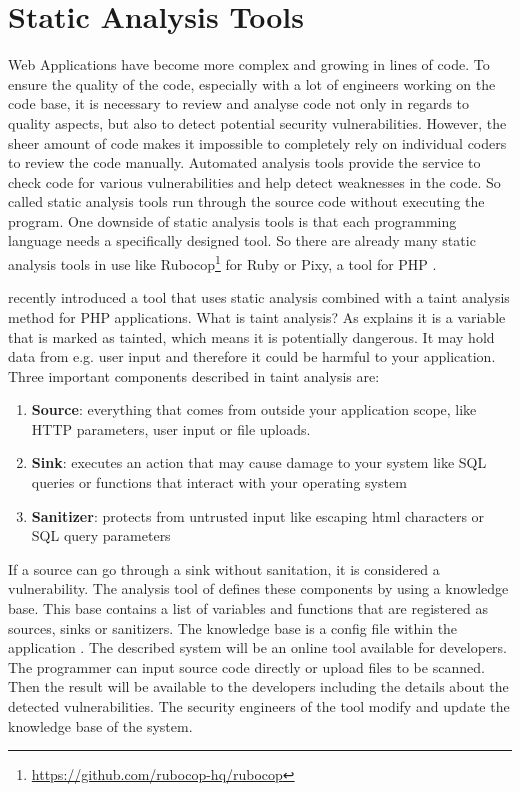 \section{Static Analysis Tools}
Web Applications have become more complex and growing in lines of code. To ensure the quality of the code, especially with a lot of engineers working on the code base, it is necessary to review and analyse code not only in regards to quality aspects, but also to detect potential security vulnerabilities. However, the sheer amount of code makes it impossible to completely rely on individual coders to review the code manually. Automated analysis tools provide the service to check code for various vulnerabilities and help detect weaknesses in the code. So called static analysis tools run through the source code without executing the program. One downside of static analysis tools is that each programming language needs a specifically designed tool. So there are already many static analysis tools in use like Rubocop\footnote{ \url{https://github.com/rubocop-hq/rubocop}} for Ruby or Pixy, a tool for PHP \autocite[]{Jovanovic2006}. \newline 

\textcite[]{Maskur2019} recently introduced a tool that uses static analysis combined with a taint analysis method for PHP applications. What is taint analysis? As \textcite[]{Shannon2018} explains it is a variable that is marked as tainted, which means it is potentially dangerous. It may hold data from e.g. user input and therefore it could be harmful to your application. Three important components described in taint analysis are:

\begin{enumerate}
    \item \textbf{Source}: everything that comes from outside your application scope, like HTTP parameters, user input or file uploads.
    \item \textbf{Sink}: executes an action that may cause damage to your system like SQL queries or functions that interact with your operating system
    \item \textbf{Sanitizer}: protects from untrusted input like escaping html characters or SQL query parameters
\end{enumerate}

If a source can go through a sink without sanitation, it is considered a vulnerability. The analysis tool of \textcite[]{Maskur2019} defines these components by using a knowledge base. This base contains a list of variables and functions that are registered as sources, sinks or sanitizers. The knowledge base is a config file within the application \autocite[3]{Maskur2019}. The described system will be an online tool available for developers. The programmer can input source code directly or upload files to be scanned. Then the result will be available to the developers including the details about the detected vulnerabilities. The security engineers of the tool modify and update the knowledge base of the system.\newline

